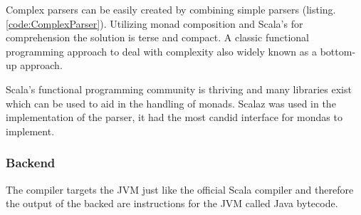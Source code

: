 \documentclass{VUMIFPSbakalaurinis}
\begin{document}
\noindent
\begin{minipage}{.45\textwidth}
  
\end{minipage}\hfill
\begin{minipage}{.45\textwidth}
  
\end{minipage}

Complex parsers can be easily created by combining simple parsers (listing. \ref{code:ComplexParser}).
Utilizing monad composition and Scala's for comprehension the solution is terse and compact.
A classic functional programming approach to deal with complexity also widely known as a bottom-up approach.

Scala's functional programming community is thriving and many libraries exist which can be used to aid in the handling of monads.
Scalaz \cite{scalaz} was used in the implementation of the parser, it had the most candid interface for mondas to implement.




%

\subsubsection{Backend}

The compiler targets the JVM just like the official Scala compiler and therefore the output of the backed are instructions for the JVM called Java bytecode.
\end{document}
